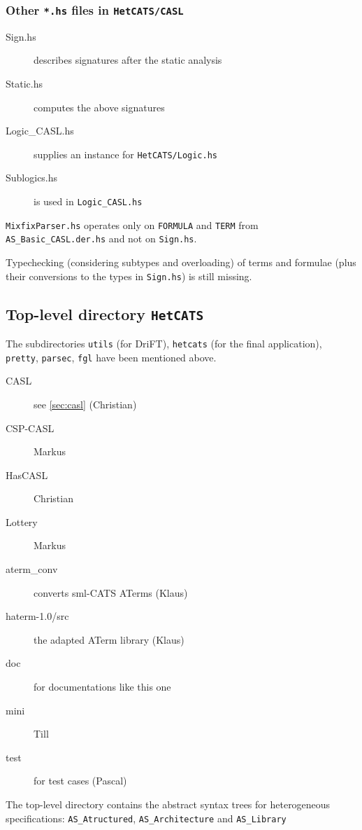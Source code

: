 \documentclass{article}
\begin{document}
\subsubsection*{Other \texttt{*.hs} files in \texttt{HetCATS/CASL}}

\begin{description}
\item[Sign.hs] describes signatures after the static analysis
\item[Static.hs] computes the above signatures
\item[Logic\_CASL.hs] supplies an instance for \texttt{HetCATS/Logic.hs}
\item[Sublogics.hs] is used in \texttt{Logic\_CASL.hs}
\end{description}
 
\texttt{MixfixParser.hs} operates only on \texttt{FORMULA} and
\texttt{TERM} from \texttt{AS\_Basic\_CASL.der.hs} and not on
\texttt{Sign.hs}. 

Typechecking (considering subtypes and overloading) of terms and
formulae (plus their conversions to the types in \texttt{Sign.hs}) is
still missing.

\subsection{Top-level directory \texttt{HetCATS}}

The subdirectories \texttt{utils} (for DriFT), \texttt{hetcats} (for
the final application), \texttt{pretty}, \texttt{parsec}, \texttt{fgl}
have been mentioned above.

\begin{description}
\item[CASL] see \ref{sec:casl} (Christian)
\item[CSP-CASL] Markus
\item[HasCASL] Christian
\item[Lottery] Markus
\item[aterm\_conv] converts sml-CATS ATerms (Klaus)
\item[haterm-1.0/src] the adapted ATerm library (Klaus)
\item[doc] for documentations like this one
\item[mini] Till
\item[test] for test cases (Pascal)
\end{description}

The top-level directory contains the abstract syntax trees for
heterogeneous specifications: \texttt{AS\_Atructured}, \texttt{AS\_Architecture} and \texttt{AS\_Library}
\end{document}
